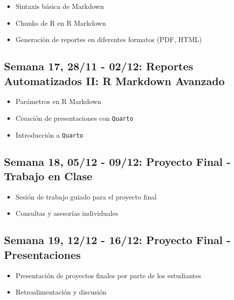 \documentclass[11pt,letter,]{article}
\providecommand{\tightlist}{%
  \setlength{\itemsep}{0pt}\setlength{\parskip}{0pt}}
\begin{document}
\begin{itemize}
\tightlist
\item
  Sintaxis básica de Markdown
\item
  Chunks de R en R Markdown
\item
  Generación de reportes en diferentes formatos (PDF, HTML)
\end{itemize}

\hypertarget{semana-17-2811---0212-reportes-automatizados-ii-r-markdown-avanzado}{%
\subsection{Semana 17, 28/11 - 02/12: Reportes Automatizados II: R
Markdown
Avanzado}\label{semana-17-2811---0212-reportes-automatizados-ii-r-markdown-avanzado}}

\begin{itemize}
\tightlist
\item
  Parámetros en R Markdown
\item
  Creación de presentaciones con \texttt{Quarto}
\item
  Introducción a \texttt{Quarto}
\end{itemize}

\hypertarget{semana-18-0512---0912-proyecto-final---trabajo-en-clase}{%
\subsection{Semana 18, 05/12 - 09/12: Proyecto Final - Trabajo en
Clase}\label{semana-18-0512---0912-proyecto-final---trabajo-en-clase}}

\begin{itemize}
\tightlist
\item
  Sesión de trabajo guiado para el proyecto final
\item
  Consultas y asesorías individuales
\end{itemize}

\hypertarget{semana-19-1212---1612-proyecto-final---presentaciones}{%
\subsection{Semana 19, 12/12 - 16/12: Proyecto Final -
Presentaciones}\label{semana-19-1212---1612-proyecto-final---presentaciones}}

\begin{itemize}
\tightlist
\item
  Presentación de proyectos finales por parte de los estudiantes
\item
  Retroalimentación y discusión
\end{itemize}
\end{document}
